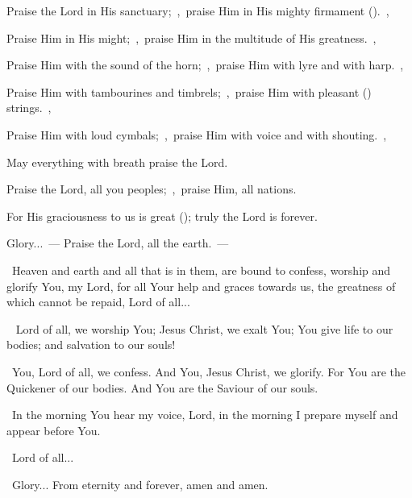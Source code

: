 \documentclass[12pt,twoside,a5paper]{article}
\begin{document}
\begin{halfparskip}
   Praise the Lord in His sanctuary;~\sep\ praise Him in His mighty firmament ().~\sep

  Praise Him in His might;~\sep\ praise Him in the multitude of His greatness.~\sep

  Praise Him with the sound of the horn;~\sep\ praise Him with lyre and with harp.~\sep

  Praise Him with tambourines and timbrels;~\sep\ praise Him with pleasant () strings.~\sep

  Praise Him with loud cymbals;~\sep\ praise Him with voice and with shouting.~\sep

  May everything with breath praise the Lord.

   Praise the Lord, all you peoples;~\sep\ praise Him, all nations.

  For His graciousness to us is great (); truly the Lord is forever.

  Glory...~--- Praise the Lord, all the earth.~--- 
\end{halfparskip}


\cc~Heaven and earth and all that is in them, are bound to confess, worship and glorify You, my Lord, for all Your help and graces towards us, the greatness of which cannot be repaid, Lord of all...



\begin{doublecols}
  \englishl \rr~ Lord of all, we worship You; Jesus Christ, we exalt You; You give life to our bodies; and salvation to our souls!

   \rr~You, Lord of all, we confess. And You, Jesus Christ, we glorify. For You are the Quickener of our bodies. And You are the Saviour of our souls.
\end{doublecols}

\dd~In the morning You hear my voice, Lord, in the morning I prepare myself and appear before You.

\rr~Lord of all...

\cc~Glory... From eternity and forever, amen and amen.
\end{document}
